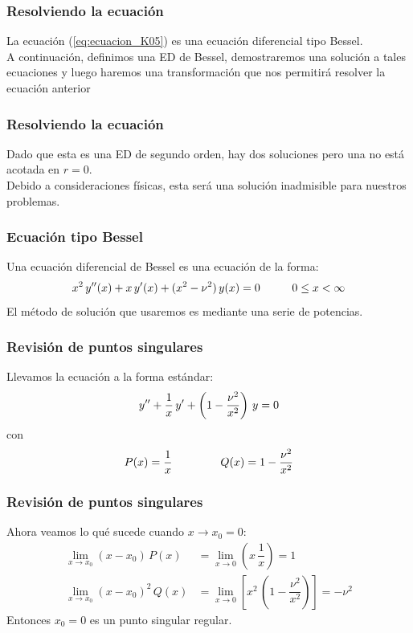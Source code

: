 \documentclass[12pt]{beamer}
\begin{document}
\begin{frame}
\frametitle{Resolviendo la ecuación}
La ecuación (\ref{eq:ecuacion_K05}) es una ecuación diferencial tipo Bessel.
\\
\bigskip
\pause
A continuación, definimos una ED de Bessel, demostraremos una solución a tales ecuaciones y luego haremos una transformación que nos permitirá resolver la ecuación anterior
\end{frame}
\begin{frame}
\frametitle{Resolviendo la ecuación}
Dado que esta es una ED de segundo orden, hay dos soluciones pero una no está acotada en $r=0$.
\\
\bigskip
\pause
Debido a consideraciones físicas, esta será una solución inadmisible para nuestros problemas.
\end{frame}
\begin{frame}
\frametitle{Ecuación tipo Bessel}
Una ecuación diferencial de Bessel es una ecuación de la forma:
\pause
\begin{align*}
x^{2} \, {y}^{\prime \prime} (x) + x \,{y}^{\prime} (x) + (x^{2} - \nu^{2}) \, y (x) = 0 \hspace{1cm} 0 \leq x < \infty
\end{align*}
\pause
El método de solución que usaremos es mediante una serie de potencias.
\end{frame}
\begin{frame}
\frametitle{Revisión de puntos singulares}
Llevamos la ecuación a la forma estándar:
\pause
\begin{align*}
    {y}^{\prime \prime} + \dfrac{1}{x} \, {y}^{\prime} + \left( 1 - \dfrac{\nu^{2}}{x^{2}} \right) \, y = 0
\end{align*}
con
\begin{align*}
    P (x) = \dfrac{1}{x} \hspace{1.5cm} Q (x) = 1 - \dfrac{\nu^{2}}{x^{2}}
\end{align*}
\end{frame}
\begin{frame}
\frametitle{Revisión de puntos singulares}
Ahora veamos lo qué sucede cuando $x \to x_{0} = 0$:
\pause
\begin{align*}
\lim_{x \to x_{0}} (x - x_{0}) \, P(x) &= \lim_{x \to 0} \left( x \, \dfrac{1}{x} \right) = 1 \\[1em]
\lim_{x \to x_{0}} (x - x_{0})^{2} \, Q(x) &= \lim_{x \to 0} \left[ x^{2} \, \left( 1 - \dfrac{\nu^{2}}{x^{2}} \right) \right] = - \nu^{2}
\end{align*}
\pause
Entonces $x_{0} = 0$ es un punto singular regular.
\end{frame}
\end{document}
